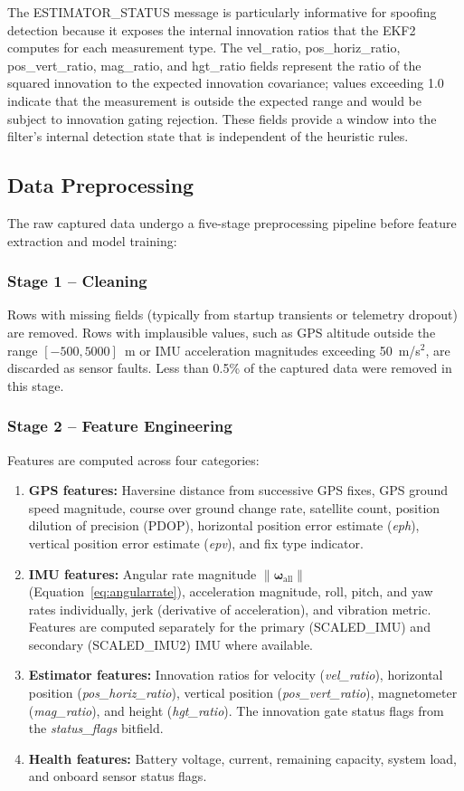 \documentclass[electronics,article,accept,moreauthors]{Definitions/mdpi}
\begin{document}
The ESTIMATOR\_STATUS message is particularly informative for spoofing detection because it exposes the internal innovation ratios that the EKF2 computes for each measurement type. The vel\_ratio, pos\_horiz\_ratio, pos\_vert\_ratio, mag\_ratio, and hgt\_ratio fields represent the ratio of the squared innovation to the expected innovation covariance; values exceeding 1.0 indicate that the measurement is outside the expected range and would be subject to innovation gating rejection. These fields provide a window into the filter's internal detection state that is independent of the heuristic rules.

\subsection{Data Preprocessing}
\label{sec:preprocessing}

The raw captured data undergo a five-stage preprocessing pipeline before feature extraction and model training:

\subsubsection{Stage 1 -- Cleaning}
Rows with missing fields (typically from startup transients or telemetry dropout) are removed. Rows with implausible values, such as GPS altitude outside the range $[-500, 5000]$~m or IMU acceleration magnitudes exceeding 50~m/s$^2$, are discarded as sensor faults. Less than 0.5\% of the captured data were removed in this stage.

\subsubsection{Stage 2 -- Feature Engineering}
Features are computed across four categories:

\begin{enumerate}
\item \textbf{GPS features:} Haversine distance from successive GPS fixes, GPS ground speed magnitude, course over ground change rate, satellite count, position dilution of precision (PDOP), horizontal position error estimate ({\it eph}), vertical position error estimate ({\it epv}), and fix type indicator.
\item \textbf{IMU features:} Angular rate magnitude $\|\boldsymbol{\omega}_{\text{all}}\|$ (Equation~\ref{eq:angularrate}), acceleration magnitude, roll, pitch, and yaw rates individually, jerk (derivative of acceleration), and vibration metric. Features are computed separately for the primary (SCALED\_IMU) and secondary (SCALED\_IMU2) IMU where available.
\item \textbf{Estimator features:} Innovation ratios for velocity ({\it vel\_ratio}), horizontal position ({\it pos\_horiz\_ratio}), vertical position ({\it pos\_vert\_ratio}), magnetometer ({\it mag\_ratio}), and height ({\it hgt\_ratio}). The innovation gate status flags from the {\it status\_flags} bitfield.
\item \textbf{Health features:} Battery voltage, current, remaining capacity, system load, and onboard sensor status flags.
\end{enumerate}
\end{document}
